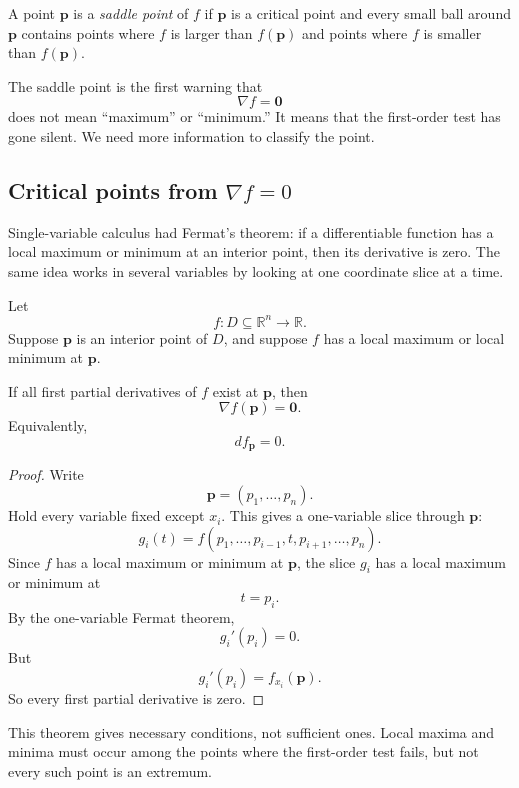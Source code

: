 \begin{definition}
A point \(\mathbf p\) is a \emph{saddle point} of \(f\) if \(\mathbf p\) is a critical
point and every small ball around \(\mathbf p\) contains points where \(f\) is larger
than \(f(\mathbf p)\) and points where \(f\) is smaller than \(f(\mathbf p)\).
\end{definition}

The saddle point is the first warning that
\[
    \nabla f=\mathbf 0
\]
does not mean ``maximum'' or ``minimum.''  It means that the first-order test has gone
silent.  We need more information to classify the point.

\subsection{Critical points from \texorpdfstring{\(\nabla f=0\)}{grad f = 0}}

Single-variable calculus had Fermat's theorem: if a differentiable function has a local
maximum or minimum at an interior point, then its derivative is zero.  The same idea
works in several variables by looking at one coordinate slice at a time.

\begin{theorem}
Let
\[
    f:D\subseteq\mathbb R^n\to\mathbb R.
\]
Suppose \(\mathbf p\) is an interior point of \(D\), and suppose \(f\) has a local
maximum or local minimum at \(\mathbf p\).

If all first partial derivatives of \(f\) exist at \(\mathbf p\), then
\[
\boxed{
    \nabla f(\mathbf p)=\mathbf 0.
}
\]
Equivalently,
\[
\boxed{
    df_{\mathbf p}=0.
}
\]
\end{theorem}

\begin{proof}
Write
\[
    \mathbf p=(p_1,\ldots,p_n).
\]
Hold every variable fixed except \(x_i\).  This gives a one-variable slice through
\(\mathbf p\):
\[
    g_i(t)=f(p_1,\ldots,p_{i-1},t,p_{i+1},\ldots,p_n).
\]
Since \(f\) has a local maximum or minimum at \(\mathbf p\), the slice \(g_i\) has a
local maximum or minimum at
\[
    t=p_i.
\]
By the one-variable Fermat theorem,
\[
    g_i'(p_i)=0.
\]
But
\[
    g_i'(p_i)=f_{x_i}(\mathbf p).
\]
So every first partial derivative is zero.
\end{proof}

This theorem gives necessary conditions, not sufficient ones.  Local maxima and minima
must occur among the points where the first-order test fails, but not every such point is
an extremum.

